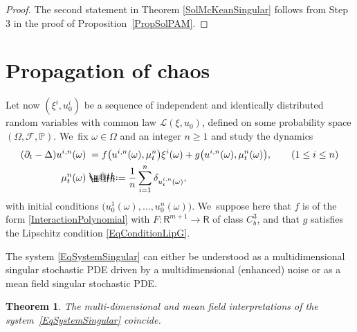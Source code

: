 \documentclass[JEP,XML,SOM,Unicode,published]{cedram}
\makeatletter
\newtheorem{thm}{Theorem}
\theoremstyle{definition}
\newcommand\bbR{\mathbf{\mathsf{R}}}
\newcommand{\mcF}{\mathcal{F}}
\newcommand{\mcL}{\mathcal{L}}
\newcommand{\bbP}{\mathbb{P}}
\newcommand*{\defeq}{\mathrel{\rlap{%
\raisebox{0.3ex}{$\m@th\cdot$}}%
\raisebox{-0.3ex}{$\m@th\cdot$}}%
=}
\makeatother
\begin{document}
\begin{proof}
The second statement in Theorem \ref{SolMcKeanSingular} follows from Step 3 in the proof of Proposition~\ref{PropSolPAM}.
\end{proof}

\section{Propagation of chaos}
\label{SectionChaos}

Let now $(\xi^i,u_0^i)$ be a sequence of independent and identically distributed random variables with common law $\mcL(\xi,u_0)$, defined on some probability space $(\Omega,\mcF,\bbP)$. We~fix $\omega\in\Omega$ and an integer $n\geq 1$ and study the dynamics
\begin{equation}\label{EqSystemSingular} \begin{split}
(\partial_t-\Delta)u^{i,n}(\omega) &\hphantom{:}= f\bigl(u^{i,n}(\omega), \mu_t^n\bigr)\xi^i(\omega) +g\bigl(u^{i,n}(\omega), \mu_t^n(\omega)\bigr), \qquad (1\leq i\leq n) \\
\mu_t^n(\omega) &\defeq \frac{1}{n}\sum_{i=1}^n\delta_{u^{i,n}_t(\omega)},
\end{split} \end{equation}
with initial conditions $\bigl(u_0^1(\omega),\dots,u_0^n(\omega)\bigr)$. We~suppose here that $f$ is of the form \eqref{InteractionPolynomial} with $F : \bbR^{m+1}\to\bbR$ of class $C^3_b$, and that $g$ satisfies the Lipschitz condition \eqref{EqConditionLipG}.

The system \eqref{EqSystemSingular} can either be understood as a multidimensional singular stochastic PDE driven by a multidimensional (enhanced) noise or as a mean field singular stochastic PDE.

\begin{thm} \label{ThmInterpretation}
The multi-dimensional and mean field interpretations of the system~\eqref{EqSystemSingular} coincide.
\end{thm}
\end{document}
